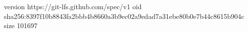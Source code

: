 version https://git-lfs.github.com/spec/v1
oid sha256:8397f10b8843fa2bbb4b8660a3b9ec02a9edad7a31ebe80b0e7b44c8615b904c
size 101697
